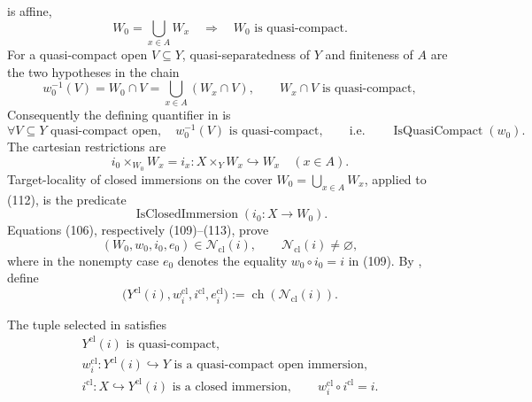 \begin{definition}
  is affine,
  \[
    W_0=\bigcup_{x\in A}W_x\quad\Longrightarrow\quad
    W_0\text{ is quasi-compact}.                                  \tag{110}
  \]
  For a quasi-compact open \(V\subseteq Y\), quasi-separatedness of \(Y\)
  and finiteness of \(A\) are the two hypotheses in the chain
  \[
    w_0^{-1}(V)=W_0\cap V
      =\bigcup_{x\in A}(W_x\cap V),\qquad
    W_x\cap V\text{ is quasi-compact},                             \tag{111}
  \]
  Consequently the defining quantifier in
   is
  \[
    \forall V\subseteq Y\text{ quasi-compact open},\quad
      w_0^{-1}(V)\text{ is quasi-compact},
    \qquad\text{i.e.}\qquad
    \operatorname{IsQuasiCompact}(w_0).
  \]
  The cartesian restrictions are
  \[
    i_0\times_{W_0}W_x
      =i_x\colon X\times_YW_x\hookrightarrow W_x\quad(x\in A).    \tag{112}
  \]
  Target-locality of closed immersions on the cover
  \(W_0=\bigcup_{x\in A}W_x\), applied to (112), is the predicate
  \[
    \operatorname{IsClosedImmersion}(i_0\colon X\to W_0).          \tag{113}
  \]
  Equations (106), respectively (109)--(113), prove
  \[
    (W_0,w_0,i_0,e_0)\in\mathscr N_{\mathrm{cl}}(i),\qquad
    \mathscr N_{\mathrm{cl}}(i)\neq\varnothing,                    \tag{114}
  \]
  where in the nonempty case
  \(e_0\) denotes the equality \(w_0\circ i_0=i\) in (109).
  By , define
  \[
    \bigl(Y^{\mathrm{cl}}(i),w_i^{\mathrm{cl}},
      i^{\mathrm{cl}},e_i^{\mathrm{cl}}\bigr)
      :=\operatorname{ch}(\mathscr N_{\mathrm{cl}}(i)).            \tag{115}
  \]
\end{definition}

\begin{lemma}
  \label{lemma:nagata-immersion-shrink-to-closed}

  The tuple selected in
   satisfies
  \[
  \begin{gathered}
    Y^{\mathrm{cl}}(i)\text{ is quasi-compact},\\
    w_i^{\mathrm{cl}}\colon Y^{\mathrm{cl}}(i)\hookrightarrow Y
      \text{ is a quasi-compact open immersion},\\
    i^{\mathrm{cl}}\colon X\hookrightarrow Y^{\mathrm{cl}}(i)
      \text{ is a closed immersion},\qquad
    w_i^{\mathrm{cl}}\circ i^{\mathrm{cl}}=i.
  \end{gathered}
  \]
\end{lemma}

